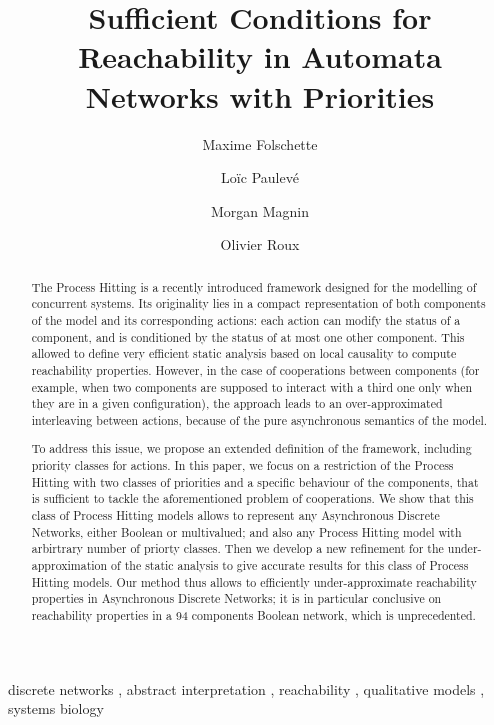 \documentclass{elsarticle}
\begin{document}
\begin{frontmatter}
\title{Sufficient Conditions for Reachability in Automata Networks with Priorities}

\author[irccyn]{Maxime Folschette}
\author[lri,amib]{Loïc Paulevé}
\author[irccyn]{Morgan Magnin}
\author[irccyn]{Olivier Roux}

\address[irccyn]{LUNAM Universit\'e, \'Ecole Centrale de Nantes, IRCCyN UMR CNRS 6597\\
(Institut de Recherche en Communications et Cybern\'etique de Nantes)\\
1 rue de la No\"e - B.P. 92101 - 44321 Nantes Cedex 3, France.}

\address[lri]{CNRS, Laboratoire de Recherche en Informatique (LRI)\\
		Université Paris-Sud - CNRS UMR 8623, France}
\address[amib]{AMIB group, Inria Saclay, France}{}



\begin{abstract}
The Process Hitting is a recently introduced framework designed for the modelling of concurrent systems.
Its originality lies in a compact representation of both components of the model and its corresponding actions:
each action can modify the status of a component, and is conditioned by the status of at most one other component.
This allowed to define very efficient static analysis based on local causality to compute reachability properties.
However, in the case of cooperations between components (for example, when two components are supposed to interact with a third one only when they are in a given configuration), the approach leads to an over-approximated interleaving between actions, because of the pure asynchronous semantics of the model.

To address this issue, we propose an extended definition of the framework, including priority classes for actions.
In this paper, we focus on a restriction of the Process Hitting with two classes of priorities and a specific behaviour of the components, that is sufficient to tackle the aforementioned problem of cooperations.
We show that this class of Process Hitting models allows to represent any
Asynchronous Discrete Networks, either Boolean or multivalued; and also any
Process Hitting model with arbirtrary number of priorty classes.
Then we develop a new refinement for the under-approximation of the static analysis to give accurate results for this class of Process Hitting models.
Our method thus allows to efficiently under-approximate reachability properties in Asynchronous Discrete Networks;
it is in particular conclusive on reachability properties in a 94 components Boolean network, which is unprecedented.
\end{abstract}
\begin{keyword}
discrete networks \sep
abstract interpretation \sep
reachability \sep
qualitative models \sep
systems biology
\end{keyword}
\end{frontmatter}
\end{document}
